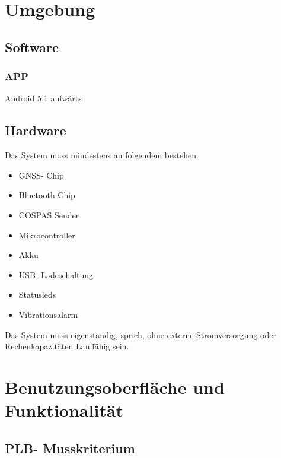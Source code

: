 \documentclass[a4paper]{scrreprt}
\begin{document}
\chapter{Umgebung}
\section{Software}
\subsection{APP}
Android 5.1 aufwärts 
\section{Hardware}
Das System muss mindestens au folgendem bestehen:
\begin{itemize}
	\item GNSS- Chip
	\item Bluetooth Chip
	\item COSPAS Sender
	\item Mikrocontroller
	\item Akku
	\item USB- Ladeschaltung
	\item Statusleds
	\item Vibrationsalarm
\end{itemize}
 Das System muss eigenständig, sprich, ohne externe Stromversorgung oder Rechenkapazitäten Lauffähig sein.
 
\chapter{Benutzungsoberfläche und Funktionalität}
\section{PLB- Musskriterium}
\end{document}
